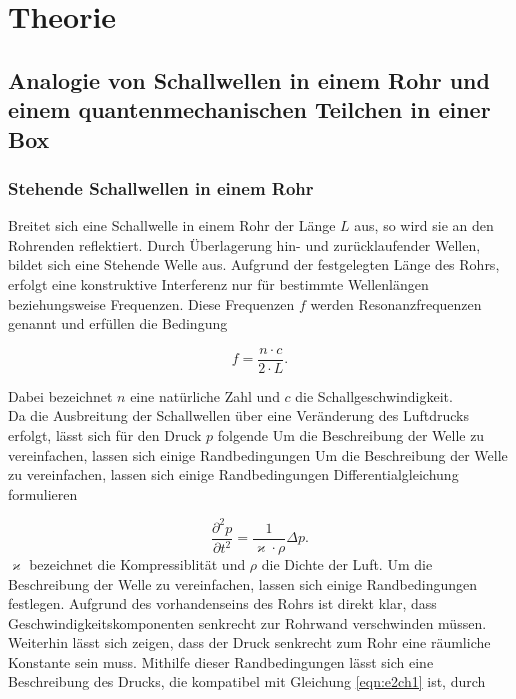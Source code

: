 \section{Theorie}
\label{sec:Theorie}


\subsection{Analogie von Schallwellen in einem Rohr und einem quantenmechanischen Teilchen in einer Box}
\label{subsec:tch1}

\subsubsection{Stehende Schallwellen in einem Rohr}
\label{subsubsec:tch11}
Breitet sich eine Schallwelle in einem Rohr der Länge $L$ aus, so wird sie an den Rohrenden reflektiert.
Durch Überlagerung hin- und zurücklaufender Wellen, bildet sich eine Stehende Welle aus.
Aufgrund der festgelegten Länge des Rohrs, erfolgt eine konstruktive Interferenz nur für bestimmte Wellenlängen
beziehungsweise Frequenzen. Diese Frequenzen $f$ werden Resonanzfrequenzen genannt und erfüllen die Bedingung


\begin{equation}
  \label{eqn:e1ch1}
  f = \frac{n \cdot c}{2 \cdot L}.
\end{equation}


Dabei bezeichnet $n$ eine natürliche Zahl und $c$ die Schallgeschwindigkeit.\\
Da die Ausbreitung der Schallwellen über eine Veränderung des Luftdrucks erfolgt, lässt sich für den
Druck $p$ folgende Um die Beschreibung der Welle zu vereinfachen, lassen sich einige Randbedingungen
Um die Beschreibung der Welle zu vereinfachen, lassen sich einige Randbedingungen
Differentialgleichung formulieren

\begin{equation}
  \label{eqn:e2ch1}
  \frac{\partial ^2 p}{\partial  t^2} = \frac{1}{\varkappa \cdot \rho} \Delta  p.
\end{equation}
$\varkappa$ bezeichnet die Kompressiblität und $\rho$ die Dichte der Luft.
Um die Beschreibung der Welle zu vereinfachen, lassen sich einige Randbedingungen
festlegen. Aufgrund des vorhandenseins des Rohrs ist direkt klar, dass Geschwindigkeitskomponenten
senkrecht zur Rohrwand verschwinden müssen. Weiterhin lässt sich zeigen, dass der Druck senkrecht zum Rohr
eine räumliche Konstante sein muss.
Mithilfe dieser Randbedingungen lässt sich eine Beschreibung des Drucks,
die kompatibel mit Gleichung \eqref{eqn:e2ch1} ist, durch


